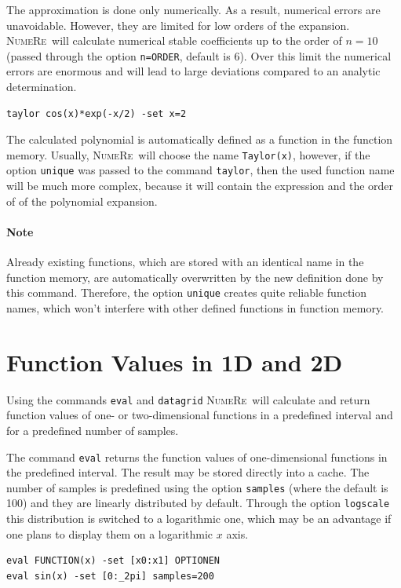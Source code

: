 \documentclass[DIV=14,headsepline,footsepline]{scrbook}
\newcommand{\NR}{\textsc{Nu\-me\-Re}}
\begin{document}
				The approximation is done only numerically. As a result, numerical errors are unavoidable. However, they are limited for low orders of the expansion. \NR\ will calculate numerical stable coefficients up to the order of $n = 10$ (passed through the option \lstinline+n=ORDER+, default is 6). Over this limit the numerical errors are enormous and will lead to large deviations compared to an analytic determination.
				\begin{lstlisting}
taylor cos(x)*exp(-x/2) -set x=2
				\end{lstlisting}
				
				The calculated polynomial is automatically defined as a function in the function memory. Usually, \NR\ will choose the name \lstinline+Taylor(x)+, however, if the option \lstinline+unique+ was passed to the command \lstinline+taylor+, then the used function name will be much more complex, because it will contain the expression and the order of of the polynomial expansion.
				\paragraph{Note} Already existing functions, which are stored with an identical name in the function memory, are automatically overwritten by the new definition done by this command. Therefore, the option \lstinline+unique+ creates quite reliable function names, which won't interfere with other defined functions in function memory.
				
			\section{Function Values in 1D and 2D} %
				Using the commands \lstinline+eval+ and \lstinline+datagrid+ \NR\ will calculate and return function values of one- or two-dimensional functions in a predefined interval and for a predefined number of samples.
				
				The command \lstinline+eval+ returns the function values of one-dimensional functions in the predefined interval. The result may be stored directly into a cache. The number of samples is predefined using the option \lstinline+samples+ (where the default is 100) and they are linearly distributed by default. Through the option \lstinline+logscale+ this distribution is switched to a logarithmic one, which may be an advantage if one plans to display them on a logarithmic $x$ axis.
				\begin{lstlisting}
eval FUNCTION(x) -set [x0:x1] OPTIONEN
eval sin(x) -set [0:_2pi] samples=200
				\end{lstlisting}
				
\end{document}
